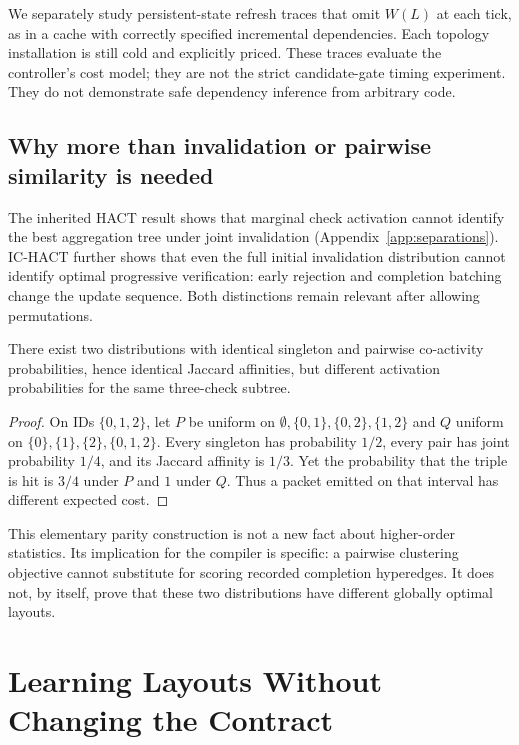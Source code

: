 \documentclass[11pt]{article}
\theoremstyle{definition}\newtheorem{definition}[theorem]{Definition}
\begin{document}
We separately study persistent-state refresh traces that omit $W(L)$ at each tick, as in a cache with correctly specified incremental dependencies. Each topology installation is still cold and explicitly priced. These traces evaluate the controller's cost model; they are not the strict candidate-gate timing experiment. They do not demonstrate safe dependency inference from arbitrary code.

\subsection{Why more than invalidation or pairwise similarity is needed}
The inherited HACT result shows that marginal check activation cannot identify the best aggregation tree under joint invalidation (Appendix~\ref{app:separations}). IC-HACT further shows that even the full initial invalidation distribution cannot identify optimal progressive verification: early rejection and completion batching change the update sequence. Both distinctions remain relevant after allowing permutations.

\begin{proposition}\label{prop:pairwise}
There exist two distributions with identical singleton and pairwise co-activity probabilities, hence identical Jaccard affinities, but different activation probabilities for the same three-check subtree.
\end{proposition}
\begin{proof}
On IDs $\{0,1,2\}$, let $P$ be uniform on $\emptyset,\{0,1\},\{0,2\},\{1,2\}$ and $Q$ uniform on $\{0\},\{1\},\{2\},\{0,1,2\}$. Every singleton has probability $1/2$, every pair has joint probability $1/4$, and its Jaccard affinity is $1/3$. Yet the probability that the triple is hit is $3/4$ under $P$ and $1$ under $Q$. Thus a packet emitted on that interval has different expected cost.\end{proof}
This elementary parity construction is not a new fact about higher-order statistics. Its implication for the compiler is specific: a pairwise clustering objective cannot substitute for scoring recorded completion hyperedges. It does not, by itself, prove that these two distributions have different globally optimal layouts.

\section{Learning Layouts Without Changing the Contract}\label{sec:compiler}
\end{document}
